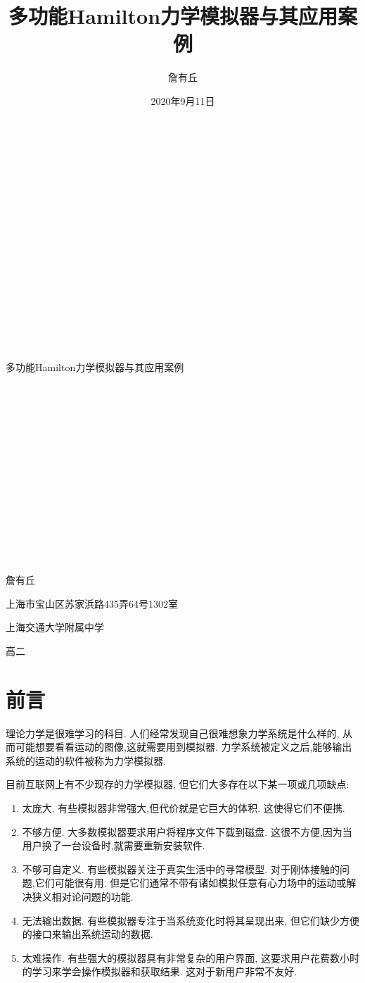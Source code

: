 \documentclass[12pt]{article}
\date{2020年9月11日}
\title{多功能Hamilton力学模拟器与其应用案例}
\author{詹有丘}
\begin{document}
~

~

~

~

~

~

~

~

~

\begin{centering}
\Huge
多功能Hamilton力学模拟器与其应用案例

~

~

~

~

~

~

~

~
\end{centering}

\begin{flushright}
\normalsize
詹有丘

上海市宝山区苏家浜路435弄64号1302室

上海交通大学附属中学

高二
\end{flushright}

\newpage

\tableofcontents

\section{前言}
\label{sec:intro}

\fontsize{12pt}{28pt}\selectfont
\setlength{\baselineskip}{28pt}
理论力学是很难学习的科目.
人们经常发现自己很难想象力学系统是什么样的,
从而可能想要看看运动的图像,这就需要用到模拟器.
力学系统被定义之后,能够输出系统的运动的软件被称为力学模拟器.

目前互联网上有不少现存的力学模拟器,
但它们大多存在以下某一项或几项缺点:
\begin{enumerate}
  \item 太庞大.
  有些模拟器非常强大,但代价就是它巨大的体积.
  这使得它们不便携.

  \item 不够方便.
  大多数模拟器要求用户将程序文件下载到磁盘.
  这很不方便,因为当用户换了一台设备时,就需要重新安装软件.

  \item 不够可自定义.
  有些模拟器关注于真实生活中的寻常模型.
  对于刚体接触的问题,它们可能很有用.
  但是它们通常不带有诸如模拟任意有心力场中的运动或解决狭义相对论问题的功能.

  \item 无法输出数据.
  有些模拟器专注于当系统变化时将其呈现出来,
  但它们缺少方便的接口来输出系统运动的数据.

  \item 太难操作.
  有些强大的模拟器具有非常复杂的用户界面,
  这要求用户花费数小时的学习来学会操作模拟器和获取结果.
  这对于新用户非常不友好.
\end{enumerate}
\end{document}
